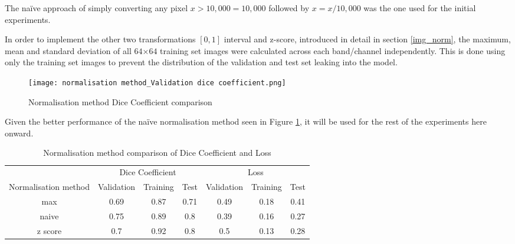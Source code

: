 The na\"ive approach of simply converting any pixel $x>10,000=10,000$ followed by $x=x/10,000$ was the one used for the initial experiments.

In order to implement the other two transformations $[0,1]$ interval and z-score, introduced in detail in section \ref{img_norm}, the maximum, mean and standard deviation of all $64$×$64$ training set images were calculated across each band/channel independently. This is done using only the training set images to prevent the distribution of the validation and test set leaking into the model.
\begin{figure}[hbt!]
    \centering
    \texttt{[image: normalisation method\_Validation dice coefficient.png]}
    \caption{Normalisation method Dice Coefficient comparison}
    \label{norm_dice}
\end{figure}

Given the better performance of the  na\"ive normalisation method seen in Figure \ref{norm_dice}, it will be used for the rest of the experiments here onward.
\begin{table}[ht!] 
    \begin{center}
    \begin{tabular}{ccccccc} 
    \toprule
       & \multicolumn{3}{c}{Dice Coefficient}     & \multicolumn{3}{c}{Loss} \\
    Normalisation method & Validation & Training & Test & Validation & Training & Test \\ \midrule
    max & 0.69 & 0.87 & 0.71 & 0.49 & 0.18 & 0.41  \\ \rowcolor{lightgray} naive & 0.75 & 0.89 & 0.8 & 0.39 & 0.16 & 0.27  \\ z score & 0.7 & 0.92 & 0.8 & 0.5 & 0.13 & 0.28  \\
    \bottomrule
    \end{tabular}
  \end{center} 
  \caption{Normalisation method comparison of Dice Coefficient and Loss}\label{tab_norm}
\end{table}
